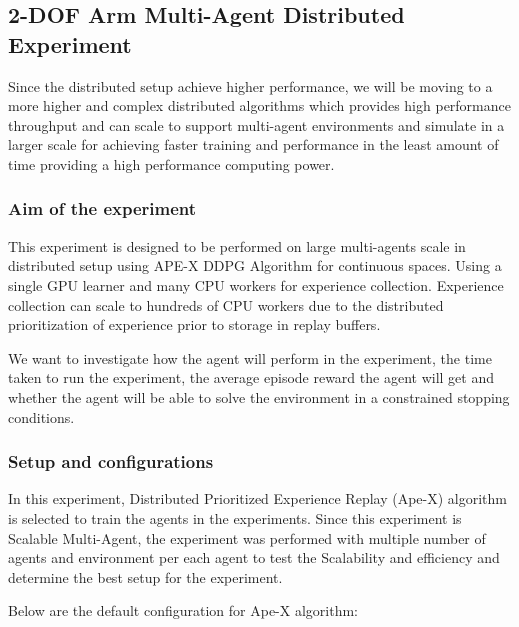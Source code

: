
\subsection{2-DOF Arm Multi-Agent Distributed Experiment}

Since the distributed setup achieve higher performance, we will be moving to a more higher and complex distributed algorithms which provides high performance throughput and can scale to support multi-agent environments and simulate in a larger scale for achieving faster training and performance in the least amount of time providing a high performance computing power.

\subsubsection{Aim of the experiment}

This experiment is designed to be performed on large multi-agents scale in distributed setup using APE-X DDPG Algorithm for continuous spaces. Using a single GPU learner and many CPU workers for experience collection. Experience collection can scale to hundreds of CPU workers due to the distributed prioritization of experience prior to storage in replay buffers.

We want to investigate how the agent will perform in the experiment, the time taken to run the experiment, the average episode reward the agent will get and whether the agent will be able to solve the environment in a constrained stopping conditions.

\subsubsection{Setup and configurations}

In this experiment, Distributed Prioritized Experience Replay (Ape-X) algorithm is selected to train the agents in the experiments. Since this experiment is Scalable Multi-Agent, the experiment was performed with multiple number of agents and environment per each agent to test the Scalability and efficiency and determine the best setup for the experiment.

Below are the default configuration for Ape-X algorithm:


